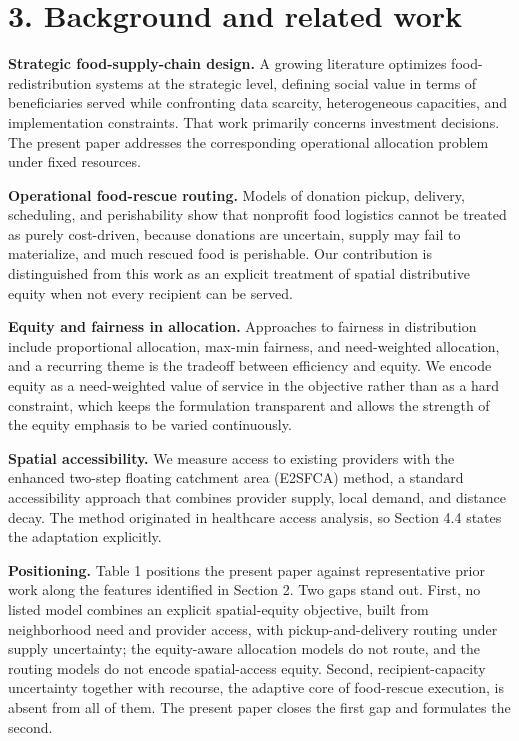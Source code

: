\documentclass[
  11pt,
]{article}
\begin{document}
\section{3. Background and related
work}\label{background-and-related-work}

\textbf{Strategic food-supply-chain design.} A growing literature
optimizes food-redistribution systems at the strategic level, defining
social value in terms of beneficiaries served while confronting data
scarcity, heterogeneous capacities, and implementation constraints. That
work primarily concerns investment decisions. The present paper
addresses the corresponding operational allocation problem under fixed
resources.

\textbf{Operational food-rescue routing.} Models of donation pickup,
delivery, scheduling, and perishability show that nonprofit food
logistics cannot be treated as purely cost-driven, because donations are
uncertain, supply may fail to materialize, and much rescued food is
perishable. Our contribution is distinguished from this work as an
explicit treatment of spatial distributive equity when not every
recipient can be served.

\textbf{Equity and fairness in allocation.} Approaches to fairness in
distribution include proportional allocation, max-min fairness, and
need-weighted allocation, and a recurring theme is the tradeoff between
efficiency and equity. We encode equity as a need-weighted value of
service in the objective rather than as a hard constraint, which keeps
the formulation transparent and allows the strength of the equity
emphasis to be varied continuously.

\textbf{Spatial accessibility.} We measure access to existing providers
with the enhanced two-step floating catchment area (E2SFCA) method, a
standard accessibility approach that combines provider supply, local
demand, and distance decay. The method originated in healthcare access
analysis, so Section 4.4 states the adaptation explicitly.

\textbf{Positioning.} Table 1 positions the present paper against
representative prior work along the features identified in Section 2.
Two gaps stand out. First, no listed model combines an explicit
spatial-equity objective, built from neighborhood need and provider
access, with pickup-and-delivery routing under supply uncertainty; the
equity-aware allocation models do not route, and the routing models do
not encode spatial-access equity. Second, recipient-capacity uncertainty
together with recourse, the adaptive core of food-rescue execution, is
absent from all of them. The present paper closes the first gap and
formulates the second.
\end{document}
